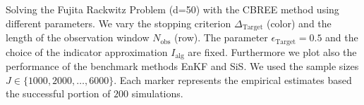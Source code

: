 Solving the Fujita Rackwitz Problem (d=50) with the CBREE method using  different parameters. We vary the stopping criterion $\Delta_{\text{Target}}$ (color) and the length of the observation window $N_\text{obs}$ (row). The parameter $\epsilon_{\text{Target}} = 0.5$ and the choice of the indicator approximation $I_\text{alg}$ are fixed. Furthermore we plot also the performance of the benchmark methods EnKF and SiS. We used the sample sizes $J \in \{1000, 2000, \ldots, 6000\}$. Each marker represents the empirical estimates based the successful portion of $200$ simulations.